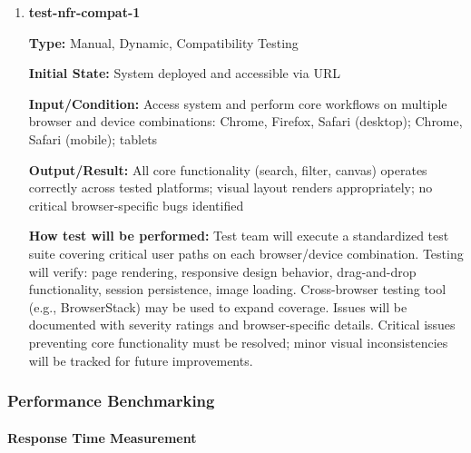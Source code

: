 \documentclass[12pt, titlepage]{article}
\begin{document}
\begin{enumerate}

\item \textbf{test-nfr-compat-1}

\textbf{Type:} Manual, Dynamic, Compatibility Testing
					
\textbf{Initial State:} System deployed and accessible via URL
					
\textbf{Input/Condition:} Access system and perform core workflows on multiple browser and device combinations: Chrome, Firefox, Safari (desktop); Chrome, Safari (mobile); tablets
					
\textbf{Output/Result:} All core functionality (search, filter, canvas) operates correctly across tested platforms; visual layout renders appropriately; no critical browser-specific bugs identified
					
\textbf{How test will be performed:} Test team will execute a standardized test suite covering critical user paths on each browser/device combination. Testing will verify: page rendering, responsive design behavior, drag-and-drop functionality, session persistence, image loading. Cross-browser testing tool (e.g., BrowserStack) may be used to expand coverage. Issues will be documented with severity ratings and browser-specific details. Critical issues preventing core functionality must be resolved; minor visual inconsistencies will be tracked for future improvements.

\end{enumerate}

\subsubsection{Performance Benchmarking}

\paragraph{Response Time Measurement}
\end{document}
